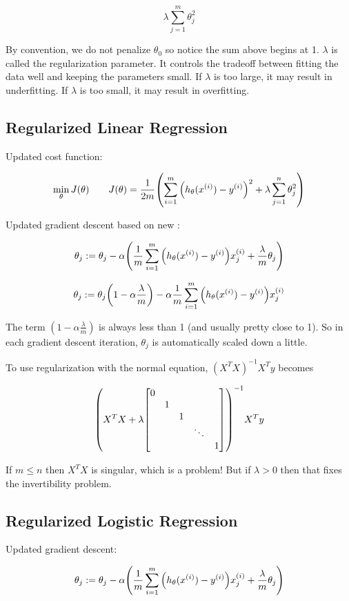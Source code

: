 \[ \lambda \sum_{j=1}^m \theta_j^2 \]

By convention, we do not penalize $\theta_0$ so notice the sum above begins at 1.
$\lambda$ is called the regularization parameter.
It controls the tradeoff between fitting the data well and keeping the parameters small.
If $\lambda$ is too large, it may result in underfitting.
If $\lambda$ is too small, it may result in overfitting.

\subsection{Regularized Linear Regression}

Updated cost function:

\[
  \min_\theta J(\theta)
  \qquad
  J(\theta) = \frac{1}{2m} \qty(
    \sum_{i=1}^m \qty( h_\theta(x_{}^{(i)}) - y_{}^{(i)} )^2
    + \lambda \sum_{j=1}^n \theta_j^2
  )
\]

Updated gradient descent based on new :

\[
  \theta_j := \theta_j - \alpha \qty(
    \frac{1}{m} \sum_{i=1}^m \qty( h_\theta(x_{}^{(i)}) - y_{}^{(i)}) x_{j}^{(i)}
    + \frac{\lambda}{m} \theta_j
  )
\]

\[
  \theta_j := \theta_j \qty( 1 - \alpha \frac{\lambda}{m} )
  - \alpha \frac{1}{m} \sum_{i=1}^m \qty( h_\theta(x_{}^{(i)}) - y_{}^{(i)}) x_{j}^{(i)}
\]

The term $(1-\alpha\frac{\lambda}{m})$ is always less than 1 (and usually pretty close to 1).
So in each gradient descent iteration, $\theta_j$ is automatically scaled down a little.

To use regularization with the normal equation, $(X^T X)^{-1} X^T y$ becomes

\[ \qty( X^T X + \lambda \mqty[\dmat{0, 1, 1, \ddots, 1 }])^{-1} X^T y \]

If $m \leq n$ then $X^T X$ is singular, which is a problem!
But if $\lambda > 0$ then that fixes the invertibility problem.

\subsection{Regularized Logistic Regression}

Updated gradient descent:

\[
  \theta_j := \theta_j - \alpha \qty(
    \frac{1}{m} \sum_{i=1}^m \qty( h_\theta(x_{}^{(i)}) - y_{}^{(i)}) x_{j}^{(i)}
    + \frac{\lambda}{m} \theta_j
  )
\]